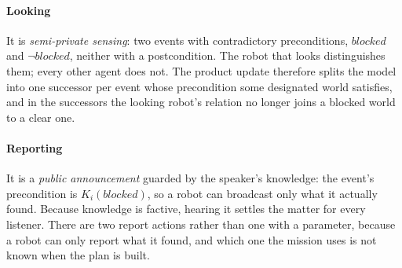 \documentclass[11pt,a4paper]{article}
\newcommand{\blocked}{\mathit{blocked}}
\begin{document}
\paragraph{Looking} It is \emph{semi-private sensing}: two events with
contradictory preconditions, $\blocked$ and $\neg\blocked$, neither with a
postcondition. The robot that looks distinguishes them; every other agent does
not. The product update therefore splits the model into one successor per event
whose precondition some designated world satisfies, and in the successors the
looking robot's relation no longer joins a blocked world to a clear one.

\paragraph{Reporting} It is a \emph{public announcement} guarded by the speaker's
knowledge: the event's precondition is $K_i(\blocked)$, so a robot can broadcast
only what it actually found. Because knowledge is factive, hearing it settles
the matter for every listener. There are two report actions rather than one
with a parameter, because a robot can only report what it found, and which one
the mission uses is not known when the plan is built.
\end{document}
